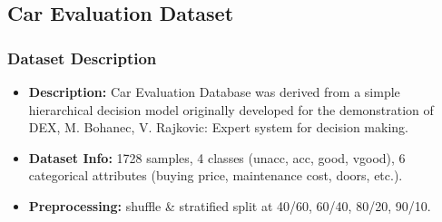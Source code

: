 \clearpage
\subsection{Car Evaluation Dataset}
\subsubsection*{Dataset Description}
\begin{itemize}
	\item \textbf{Description:} Car Evaluation Database was derived from a simple hierarchical decision model originally developed for the demonstration of DEX, M. Bohanec, V. Rajkovic: Expert system for decision making.
	\item \textbf{Dataset Info:} 1728 samples, 4 classes (unacc, acc, good, vgood), 6 categorical attributes (buying price, maintenance cost, doors, etc.).
	\item \textbf{Preprocessing:} shuffle \& stratified split at 40/60, 60/40, 80/20, 90/10.
\end{itemize}


